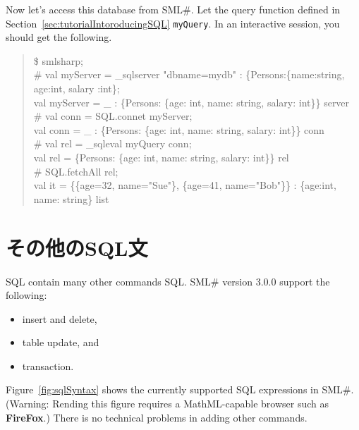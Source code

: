 \documentclass{jbook}
\newif\ifjp
\newcommand{\txt}[2]{#1}
\newcommand{\smlsharp}{SML\#}
\newcommand{\version}{3.0.0}
\newenvironment{program}{\begin{quote}\begin{tt}}%
                        {\end{tt}\end{quote}}
\begin{document}
	Now let's access this database from \smlsharp{}.
	Let the query function defined in Section~\ref{sec:tutorialIntoroducingSQL}
{\tt myQuery}.
	In an interactive session, you should get the following.
\begin{program}
\$ smlsharp;\\
\# val myServer = \_sqlserver "dbname=mydb" : \{Persons:\{name:string, age:int, salary :int\};\\
val myServer = \_ : \{Persons: \{age: int, name: string, salary: int\}\} server\\
\# val conn = SQL.connet myServer;\\
val conn = \_ : \{Persons: \{age: int, name: string, salary: int\}\} conn\\
\# val rel = \_sqleval myQuery conn;\\
val rel = \{Persons: \{age: int, name: string, salary: int\}\} rel\\
\# SQL.fetchAll rel;\\
val it = \{\{age=32, name="Sue"\}, \{age=41, name="Bob"\}\} : \{age:int, name: string\} list
\end{program}
\fi%

\section{\txt{その他のSQL文}{Other SQL statements}}
\label{sec:tutorialOtherSQLElement}

\ifjp%
	SQL言語は，データベースからデータを取り出す{\tt select}文以外に，
様々な機能が提供されています．
	\smlsharp{}の\version{}版では，以下の機能をサポートしています．
\begin{itemize}
\item タプルの追加と削除
\item テーブルの更新
\item トランザクションの実行
\end{itemize}
	図\ref{fig:sqlSyntax}に現在のSQLの構文の概要を示します．
	(注意: この図の表示には{\bf FireFox}などのMathMLを表示可能なブラウザが必要です．)
	これ以外のSQL言語の機能の追加も技術的には問題はありません．
	次版以降でより完全なSQL言語の統合をして行く予定です．
\else%
	SQL contain many other commands SQL.
	\smlsharp{} version \version{} support the following:
\begin{itemize}
\item insert and delete,
\item table update, and
\item transaction.
\end{itemize}
	Figure~\ref{fig:sqlSyntax} shows the currently supported SQL expressions in
\smlsharp{}.
	(Warning: Rending this figure requires a MathML-capable browser such as {\bf FireFox}.)
	There is no technical problems in adding other commands.
\fi%
\end{document}
